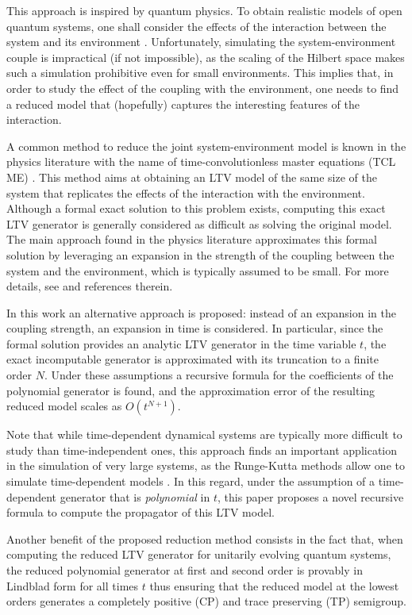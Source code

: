\documentclass[10pt,aps,pra,twocolumn,showpacs,superscriptaddress,nobalancelastpage,notitlepage,nofootinbib,longbibliography]{revtex4-2}
\begin{document}
This approach is inspired by quantum physics. 
To obtain realistic models of open quantum systems, one shall consider the effects of the interaction between the system and its environment \cite{breuer2002theory}. Unfortunately, simulating the system-environment couple is impractical (if not impossible), as the scaling of the Hilbert space makes such a simulation prohibitive even for small environments. This implies that, in order to study the effect of the coupling with the environment, one needs to find a reduced model that (hopefully) captures the interesting features of the interaction.

A common method to reduce the joint system-environment model is known in the physics literature with the name of time-convolutionless master equations (TCL ME) \cite{shibata_generalized_1977,chaturvedi_time-convolutionless_1979}. This method aims at obtaining an LTV model of the same size of the system that replicates the effects of the interaction with the environment. Although a formal exact solution to this problem exists, computing this exact LTV generator is generally considered as difficult as solving the original model. The main approach found in the physics literature approximates this formal solution by leveraging an expansion in the strength of the coupling between the system and the environment, which is typically assumed to be small. For more details, see  \cite{breuer2002theory} and references therein. 

In this work an alternative approach is proposed: instead of an expansion in the coupling strength, an expansion in time is considered. In particular, since the formal solution provides an analytic LTV generator in the time variable $t$, the exact incomputable generator is approximated with its truncation to a finite order $N$.  Under these assumptions a recursive formula for the coefficients of the polynomial generator is found, and the approximation error of the resulting reduced model scales as $O(t^{N+1})$. 

Note that while time-dependent dynamical systems are typically more difficult to study than time-independent ones, this approach finds an important application in the simulation of very large systems, as the Runge-Kutta methods allow one to simulate time-dependent models \cite{ascher1997implicit}. In this regard, under the assumption of a time-dependent generator that is {\em polynomial} in $t$, this paper proposes a novel recursive formula to compute the propagator of this LTV model.

Another benefit of the proposed reduction method consists in the fact that, when computing the reduced LTV generator for unitarily evolving quantum systems, the reduced polynomial generator at first and second order is provably in Lindblad form for all times $t$ thus ensuring that the reduced model at the lowest orders generates a completely positive (CP) and trace preserving (TP) semigroup.   
\end{document}
